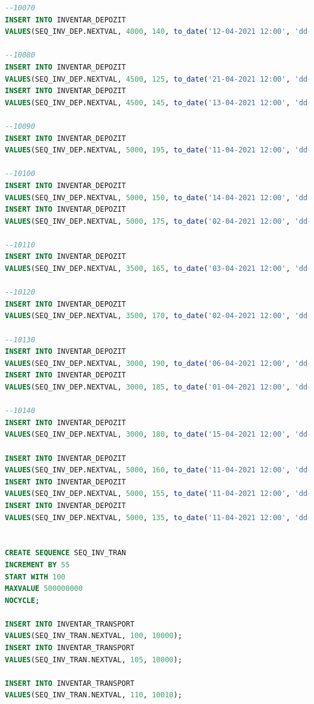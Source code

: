 \documentclass[12pt, a4paper]{article}
\begin{document}
\begin{lstlisting}[language=SQL]
--10070
INSERT INTO INVENTAR_DEPOZIT
VALUES(SEQ_INV_DEP.NEXTVAL, 4000, 140, to_date('12-04-2021 12:00', 'dd-mm-yyyy hh24:mi'), null);

--10080
INSERT INTO INVENTAR_DEPOZIT
VALUES(SEQ_INV_DEP.NEXTVAL, 4500, 125, to_date('21-04-2021 12:00', 'dd-mm-yyyy hh24:mi'), null);
INSERT INTO INVENTAR_DEPOZIT
VALUES(SEQ_INV_DEP.NEXTVAL, 4500, 145, to_date('13-04-2021 12:00', 'dd-mm-yyyy hh24:mi'), null);

--10090
INSERT INTO INVENTAR_DEPOZIT
VALUES(SEQ_INV_DEP.NEXTVAL, 5000, 195, to_date('11-04-2021 12:00', 'dd-mm-yyyy hh24:mi'), null);

--10100
INSERT INTO INVENTAR_DEPOZIT
VALUES(SEQ_INV_DEP.NEXTVAL, 5000, 150, to_date('14-04-2021 12:00', 'dd-mm-yyyy hh24:mi'), null);
INSERT INTO INVENTAR_DEPOZIT
VALUES(SEQ_INV_DEP.NEXTVAL, 5000, 175, to_date('02-04-2021 12:00', 'dd-mm-yyyy hh24:mi'), null);

--10110
INSERT INTO INVENTAR_DEPOZIT
VALUES(SEQ_INV_DEP.NEXTVAL, 3500, 165, to_date('03-04-2021 12:00', 'dd-mm-yyyy hh24:mi'), null);

--10120
INSERT INTO INVENTAR_DEPOZIT
VALUES(SEQ_INV_DEP.NEXTVAL, 3500, 170, to_date('02-04-2021 12:00', 'dd-mm-yyyy hh24:mi'), null);

--10130
INSERT INTO INVENTAR_DEPOZIT
VALUES(SEQ_INV_DEP.NEXTVAL, 3000, 190, to_date('06-04-2021 12:00', 'dd-mm-yyyy hh24:mi'), null);
INSERT INTO INVENTAR_DEPOZIT
VALUES(SEQ_INV_DEP.NEXTVAL, 3000, 185, to_date('01-04-2021 12:00', 'dd-mm-yyyy hh24:mi'), null);

--10140
INSERT INTO INVENTAR_DEPOZIT
VALUES(SEQ_INV_DEP.NEXTVAL, 3000, 180, to_date('15-04-2021 12:00', 'dd-mm-yyyy hh24:mi'), null);

INSERT INTO INVENTAR_DEPOZIT
VALUES(SEQ_INV_DEP.NEXTVAL, 5000, 160, to_date('11-04-2021 12:00', 'dd-mm-yyyy hh24:mi'), null);
INSERT INTO INVENTAR_DEPOZIT
VALUES(SEQ_INV_DEP.NEXTVAL, 5000, 155, to_date('11-04-2021 12:00', 'dd-mm-yyyy hh24:mi'), null);
INSERT INTO INVENTAR_DEPOZIT
VALUES(SEQ_INV_DEP.NEXTVAL, 5000, 135, to_date('11-04-2021 12:00', 'dd-mm-yyyy hh24:mi'), null);


CREATE SEQUENCE SEQ_INV_TRAN
INCREMENT BY 55
START WITH 100
MAXVALUE 500000000
NOCYCLE;

INSERT INTO INVENTAR_TRANSPORT
VALUES(SEQ_INV_TRAN.NEXTVAL, 100, 10000);
INSERT INTO INVENTAR_TRANSPORT
VALUES(SEQ_INV_TRAN.NEXTVAL, 105, 10000);

INSERT INTO INVENTAR_TRANSPORT
VALUES(SEQ_INV_TRAN.NEXTVAL, 110, 10010);


\end{lstlisting}
\end{document}
